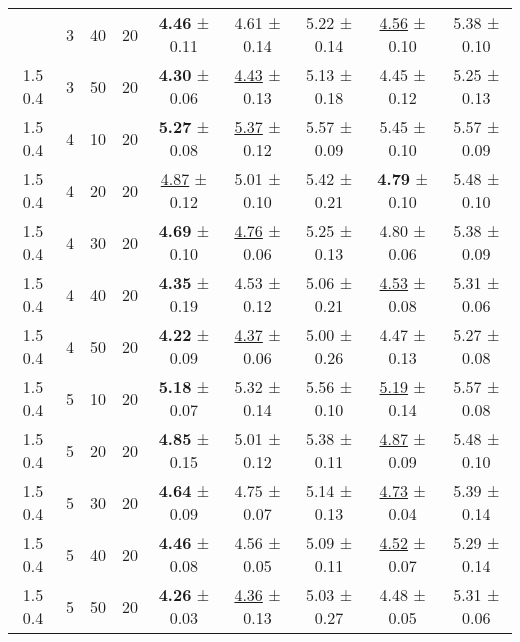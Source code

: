 \begin{tabular}{ccccccccc}
\begin{tabular}{lllllllll}
1.5 0.4 & 3 & 40 & 20 &    \textbf{4.46} ± 0.11 &             4.61 ± 0.14 & 5.22 ± 0.14 & \underline{4.56} ± 0.10 & 5.38 ± 0.10 \\
1.5 0.4 & 3 & 50 & 20 &    \textbf{4.30} ± 0.06 & \underline{4.43} ± 0.13 & 5.13 ± 0.18 &             4.45 ± 0.12 & 5.25 ± 0.13 \\
1.5 0.4 & 4 & 10 & 20 &    \textbf{5.27} ± 0.08 & \underline{5.37} ± 0.12 & 5.57 ± 0.09 &             5.45 ± 0.10 & 5.57 ± 0.09 \\
1.5 0.4 & 4 & 20 & 20 & \underline{4.87} ± 0.12 &             5.01 ± 0.10 & 5.42 ± 0.21 &    \textbf{4.79} ± 0.10 & 5.48 ± 0.10 \\
1.5 0.4 & 4 & 30 & 20 &    \textbf{4.69} ± 0.10 & \underline{4.76} ± 0.06 & 5.25 ± 0.13 &             4.80 ± 0.06 & 5.38 ± 0.09 \\
1.5 0.4 & 4 & 40 & 20 &    \textbf{4.35} ± 0.19 &             4.53 ± 0.12 & 5.06 ± 0.21 & \underline{4.53} ± 0.08 & 5.31 ± 0.06 \\
1.5 0.4 & 4 & 50 & 20 &    \textbf{4.22} ± 0.09 & \underline{4.37} ± 0.06 & 5.00 ± 0.26 &             4.47 ± 0.13 & 5.27 ± 0.08 \\
1.5 0.4 & 5 & 10 & 20 &    \textbf{5.18} ± 0.07 &             5.32 ± 0.14 & 5.56 ± 0.10 & \underline{5.19} ± 0.14 & 5.57 ± 0.08 \\
1.5 0.4 & 5 & 20 & 20 &    \textbf{4.85} ± 0.15 &             5.01 ± 0.12 & 5.38 ± 0.11 & \underline{4.87} ± 0.09 & 5.48 ± 0.10 \\
1.5 0.4 & 5 & 30 & 20 &    \textbf{4.64} ± 0.09 &             4.75 ± 0.07 & 5.14 ± 0.13 & \underline{4.73} ± 0.04 & 5.39 ± 0.14 \\
1.5 0.4 & 5 & 40 & 20 &    \textbf{4.46} ± 0.08 &             4.56 ± 0.05 & 5.09 ± 0.11 & \underline{4.52} ± 0.07 & 5.29 ± 0.14 \\
1.5 0.4 & 5 & 50 & 20 &    \textbf{4.26} ± 0.03 & \underline{4.36} ± 0.13 & 5.03 ± 0.27 &             4.48 ± 0.05 & 5.31 ± 0.06 \\
\bottomrule
\end{tabular}

